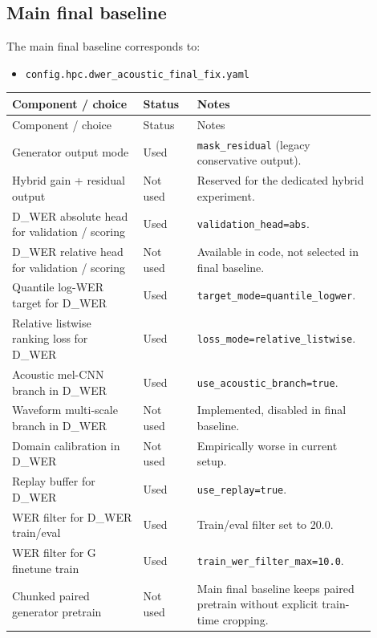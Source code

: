 \documentclass[11pt]{article}
\begin{document}
\subsection{Main final baseline}
The main final baseline corresponds to:
\begin{itemize}[leftmargin=*]
    \item \texttt{config.hpc.dwer\_acoustic\_final\_fix.yaml}
\end{itemize}

\begin{longtable}{>{\raggedright\arraybackslash}p{0.34\linewidth} >{\raggedright\arraybackslash}p{0.14\linewidth} >{\raggedright\arraybackslash}p{0.42\linewidth}}
\toprule
Component / choice & Status & Notes \\
\midrule
\endfirsthead
\toprule
Component / choice & Status & Notes \\
\midrule
\endhead
Generator output mode & Used & \texttt{mask\_residual} (legacy conservative output). \\
Hybrid gain + residual output & Not used & Reserved for the dedicated hybrid experiment. \\
D\_WER absolute head for validation / scoring & Used & \texttt{validation\_head=abs}. \\
D\_WER relative head for validation / scoring & Not used & Available in code, not selected in final baseline. \\
Quantile log-WER target for D\_WER & Used & \texttt{target\_mode=quantile\_logwer}. \\
Relative listwise ranking loss for D\_WER & Used & \texttt{loss\_mode=relative\_listwise}. \\
Acoustic mel-CNN branch in D\_WER & Used & \texttt{use\_acoustic\_branch=true}. \\
Waveform multi-scale branch in D\_WER & Not used & Implemented, disabled in final baseline. \\
Domain calibration in D\_WER & Not used & Empirically worse in current setup. \\
Replay buffer for D\_WER & Used & \texttt{use\_replay=true}. \\
WER filter for D\_WER train/eval & Used & Train/eval filter set to 20.0. \\
WER filter for G finetune train & Used & \texttt{train\_wer\_filter\_max=10.0}. \\
Chunked paired generator pretrain & Not used & Main final baseline keeps paired pretrain without explicit train-time cropping. \\

\end{longtable}
\end{document}
